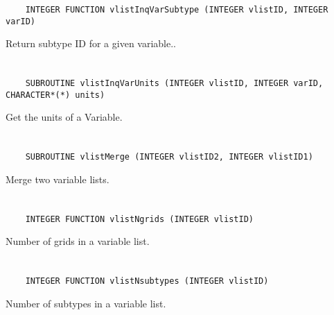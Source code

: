 \begin{verbatim}
    INTEGER FUNCTION vlistInqVarSubtype (INTEGER vlistID, INTEGER varID)
\end{verbatim}

Return subtype ID for a given variable..


\section*{\tt {}}

\begin{verbatim}
    SUBROUTINE vlistInqVarUnits (INTEGER vlistID, INTEGER varID, CHARACTER*(*) units)
\end{verbatim}

Get the units of a Variable.


\section*{\tt {}}

\begin{verbatim}
    SUBROUTINE vlistMerge (INTEGER vlistID2, INTEGER vlistID1)
\end{verbatim}

Merge two variable lists.


\section*{\tt {}}

\begin{verbatim}
    INTEGER FUNCTION vlistNgrids (INTEGER vlistID)
\end{verbatim}

Number of grids in a variable list.


\section*{\tt {}}

\begin{verbatim}
    INTEGER FUNCTION vlistNsubtypes (INTEGER vlistID)
\end{verbatim}

Number of subtypes in a variable list.


\section*{\tt {}}


